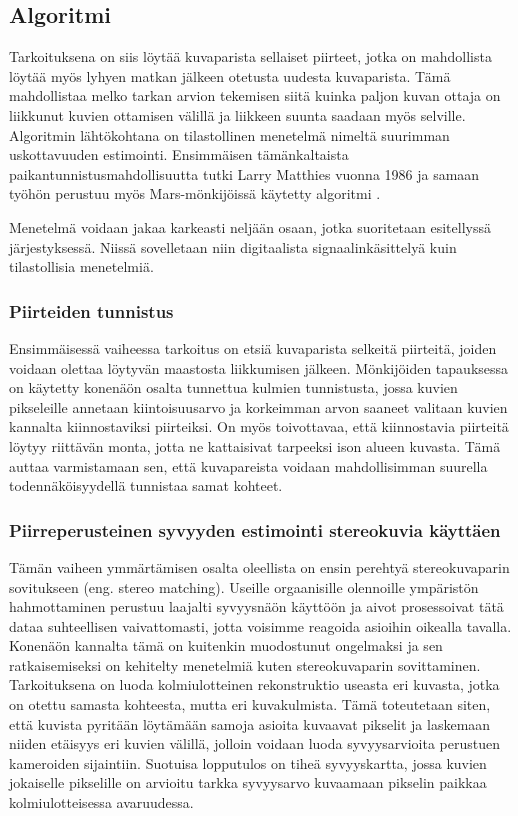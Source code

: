 \documentclass[finnish]{tktltiki2}
\theoremstyle{definition}
\theoremstyle{remark}
\begin{document}
\subsection{Algoritmi}
Tarkoituksena on siis löytää kuvaparista sellaiset piirteet, jotka on mahdollista löytää myös lyhyen matkan jälkeen otetusta uudesta kuvaparista. Tämä mahdollistaa melko tarkan arvion tekemisen siitä kuinka paljon kuvan ottaja on liikkunut kuvien ottamisen välillä ja liikkeen suunta saadaan myös selville. Algoritmin lähtökohtana on tilastollinen menetelmä nimeltä suurimman uskottavuuden estimointi. Ensimmäisen tämänkaltaista paikantunnistusmahdollisuutta tutki Larry Matthies vuonna 1986 ja samaan työhön perustuu myös Mars-mönkijöissä käytetty algoritmi \cite{matthies}.

Menetelmä voidaan jakaa karkeasti neljään osaan, jotka suoritetaan esitellyssä järjestyksessä. Niissä sovelletaan niin digitaalista signaalinkäsittelyä kuin tilastollisia menetelmiä.

\subsubsection{Piirteiden tunnistus}
Ensimmäisessä vaiheessa tarkoitus on etsiä kuvaparista selkeitä piirteitä, joiden voidaan olettaa löytyvän maastosta liikkumisen jälkeen. Mönkijöiden tapauksessa on käytetty konenäön osalta tunnettua kulmien tunnistusta, jossa kuvien pikseleille annetaan kiintoisuusarvo ja korkeimman arvon saaneet valitaan kuvien kannalta kiinnostaviksi piirteiksi. On myös toivottavaa, että kiinnostavia piirteitä löytyy riittävän monta, jotta ne kattaisivat tarpeeksi ison alueen kuvasta. Tämä auttaa varmistamaan sen, että kuvapareista voidaan mahdollisimman suurella todennäköisyydellä tunnistaa samat kohteet.\cite{cheng2005visual}

\subsubsection{Piirreperusteinen syvyyden estimointi stereokuvia käyttäen}
Tämän vaiheen ymmärtämisen osalta oleellista on ensin perehtyä stereokuvaparin sovitukseen (eng. stereo matching). Useille orgaanisille olennoille ympäristön hahmottaminen perustuu laajalti syvyysnäön käyttöön ja aivot prosessoivat tätä dataa suhteellisen vaivattomasti, jotta voisimme reagoida asioihin oikealla tavalla. Konenäön kannalta tämä on kuitenkin muodostunut ongelmaksi ja sen ratkaisemiseksi on kehitelty menetelmiä kuten stereokuvaparin sovittaminen. Tarkoituksena on luoda kolmiulotteinen rekonstruktio useasta eri kuvasta, jotka on otettu samasta kohteesta, mutta eri kuvakulmista. Tämä toteutetaan siten, että kuvista pyritään löytämään samoja asioita kuvaavat pikselit ja laskemaan niiden etäisyys eri kuvien välillä, jolloin voidaan luoda syvyysarvioita perustuen kameroiden sijaintiin. Suotuisa lopputulos on tiheä syvyyskartta, jossa kuvien jokaiselle pikselille on arvioitu tarkka syvyysarvo kuvaamaan pikselin paikkaa kolmiulotteisessa avaruudessa.\cite{hong2010study}
\end{document}
